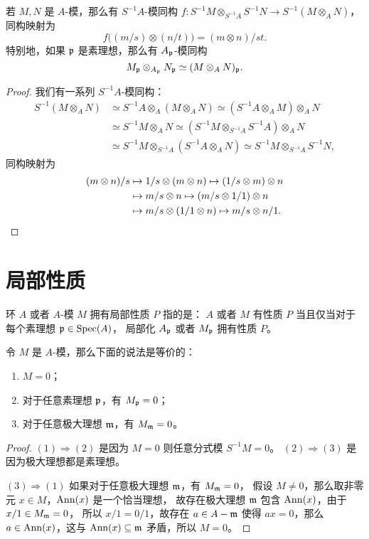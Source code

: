 \begin{proposition}\label{prop:isomorphism of tensor and fraction}
  若 $M,N$ 是 $A$-模，那么有 $S^{-1}A$-模同构 
  $f:S^{-1}M\otimes_{S^{-1}A}S^{-1}N\to S^{-1}(M\otimes_AN)$，同构映射为
  \[
    f\bigl((m/s)\otimes (n/t)\bigr)=(m\otimes n)/st  .
  \]
  特别地，如果 $\mathfrak{p}$ 是素理想，那么有 $A_{\mathfrak{p}}$-模同构
  \[
    M_{\mathfrak{p}}\otimes_{A_{\mathfrak{p}}} N_{\mathfrak{p}}\simeq
    (M\otimes_AN)_{\mathfrak{p}}.  
  \]
\end{proposition}
\begin{proof}
  我们有一系列 $S^{-1}A$-模同构：
  \begin{align*}
    S^{-1}(M\otimes_AN)&\simeq S^{-1}A \otimes_A(M\otimes_AN)\simeq
    (S^{-1}A\otimes_AM)\otimes_AN \\
    &\simeq S^{-1}M\otimes_AN\simeq (S^{-1}M\otimes_{S^{-1}A}S^{-1}A)\otimes_AN\\
    &\simeq S^{-1}M\otimes_{S^{-1}A}(S^{-1}A\otimes_AN)\simeq
    S^{-1}M\otimes_{S^{-1}A}S^{-1}N,
  \end{align*}
  同构映射为
  \begin{align*}
    (m\otimes n)/s&\mapsto 1/s\otimes (m\otimes n)\mapsto
    (1/s\otimes m)\otimes n \\
    &\mapsto m/s\otimes n\mapsto (m/s\otimes 1/1)\otimes n\\
    &\mapsto m/s\otimes(1/1\otimes n)\mapsto m/s\otimes n/1.\qedhere
  \end{align*}
\end{proof}

\section{局部性质}

环 $A$ 或者 $A$-模 $M$ 拥有局部性质 $P$ 指的是：
$A$ 或者 $M$ 有性质 $P$ 当且仅当对于每个素理想 $\mathfrak{p}\in\operatorname{Spec}(A)$，
局部化 $A_{\mathfrak{p}}$ 或者 $M_{\mathfrak{p}}$ 拥有性质 $P$。

\begin{proposition}[零模是局部性质]\label{prop:zero is local}
  令 $M$ 是 $A$-模，那么下面的说法是等价的：
  \begin{enumerate}
    \item $M=0$；
    \item 对于任意素理想 $\mathfrak{p}$，有 $M_{\mathfrak{p}}=0$；
    \item 对于任意极大理想 $\mathfrak{m}$，有 $M_{\mathfrak{m}}=0$。
  \end{enumerate}
\end{proposition}
\begin{proof}
  $(1)\Rightarrow (2)$ 是因为 $M=0$ 则任意分式模 $S^{-1}M=0$。
  $(2)\Rightarrow (3)$ 是因为极大理想都是素理想。
  
  $(3)\Rightarrow (1)$ 如果对于任意极大理想 $\mathfrak{m}$，有 $M_{\mathfrak{m}}=0$，
  假设 $M\neq 0$，那么取非零元 $x\in M$，$\operatorname{Ann}(x)$ 是一个恰当理想，
  故存在极大理想 $\mathfrak{m}$ 包含 $\operatorname{Ann}(x)$，由于 $x/1\in M_{\mathfrak{m}}=0$，
  所以 $x/1=0/1$，故存在 $a\in A-\mathfrak{m}$ 使得 $ax=0$，那么
  $a\in\operatorname{Ann}(x)$，这与 $\operatorname{Ann}(x)\subseteq\mathfrak{m}$ 矛盾，所以
  $M=0$。
\end{proof}

